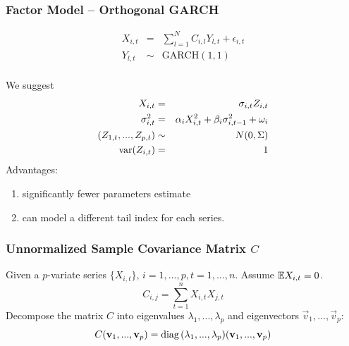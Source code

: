 \documentclass{beamer}
\begin{document}
\begin{frame}
  \frametitle{Factor Model -- Orthogonal GARCH}
  \begin{eqnarray*}
    X_{i, t} &=& \sum_{l=1}^N C_{i, l} Y_{l, t} + \epsilon_{i, t} \\
    Y_{l, t} &\sim& \text{GARCH}(1,1) \\
    
  \end{eqnarray*}
\end{frame}

\begin{frame}
  We suggest
  \begin{eqnarray*}
    X_{i, t} &=& \sigma_{i, t} Z_{i, t} \\
    \sigma_{i, t}^2 &=& \alpha_{i} X_{i, t}^2 + \beta_{i} \sigma_{i, t-1}^2 + \omega_i \\
    (Z_{1, t}, ..., Z_{p, t}) &\sim& N(0, \Sigma) \\
    \text{var}(Z_{i,t}) &=& 1
  \end{eqnarray*}
  Advantages:
  \begin{enumerate}
  \item significantly fewer parameters estimate
  \item can model a different tail index for each series.
  \end{enumerate}
\end{frame}

\begin{frame}
  \frametitle{Unnormalized Sample Covariance Matrix $C$}
  Given a $p$-variate series $\{X_{i, t}\}$, $i=1,...,p, t=1,...,n$.
  Assume $\mathbb{E} X_{i, t} = 0$.
  \[
  C_{i, j} = \sum_{t=1}^n X_{i,t} X_{j,t}
  \]
  Decompose the matrix $C$ into eigenvalues $\lambda_1, ...,
  \lambda_p$ and eigenvectors $\vec v_1, ..., \vec v_p$:
  \[
  C (\mathbf{v}_1, ..., \mathbf{v}_p) = \text{diag\,}(\lambda_1, ..., \lambda_p) (\mathbf{v}_1, ..., \mathbf{v}_p)
  \]
\end{frame}
\end{document}
